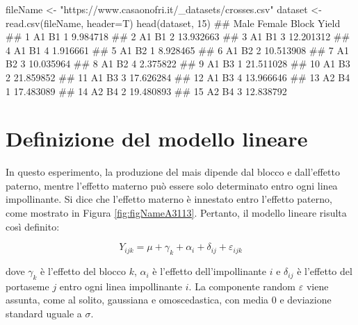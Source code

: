 \documentclass[a4paper,12pt,oneside]{book}
\newenvironment{Shaded}{\begin{snugshade}}{\end{snugshade}}
\newcommand{\DecValTok}[1]{#1}
\newcommand{\StringTok}[1]{#1}
\newcommand{\DocumentationTok}[1]{#1}
\newcommand{\OtherTok}[1]{#1}
\newcommand{\FunctionTok}[1]{#1}
\newcommand{\AttributeTok}[1]{#1}
\newcommand{\NormalTok}[1]{#1}
\begin{document}
\begin{Shaded}
\begin{Highlighting}[]
\NormalTok{fileName }\OtherTok{\textless{}{-}} \StringTok{"https://www.casaonofri.it/\_datasets/crosses.csv"}
\NormalTok{dataset }\OtherTok{\textless{}{-}} \FunctionTok{read.csv}\NormalTok{(fileName, }\AttributeTok{header=}\NormalTok{T)}
\FunctionTok{head}\NormalTok{(dataset, }\DecValTok{15}\NormalTok{)}
\DocumentationTok{\#\#    Male Female Block     Yield}
\DocumentationTok{\#\# 1    A1     B1     1  9.984718}
\DocumentationTok{\#\# 2    A1     B1     2 13.932663}
\DocumentationTok{\#\# 3    A1     B1     3 12.201312}
\DocumentationTok{\#\# 4    A1     B1     4  1.916661}
\DocumentationTok{\#\# 5    A1     B2     1  8.928465}
\DocumentationTok{\#\# 6    A1     B2     2 10.513908}
\DocumentationTok{\#\# 7    A1     B2     3 10.035964}
\DocumentationTok{\#\# 8    A1     B2     4  2.375822}
\DocumentationTok{\#\# 9    A1     B3     1 21.511028}
\DocumentationTok{\#\# 10   A1     B3     2 21.859852}
\DocumentationTok{\#\# 11   A1     B3     3 17.626284}
\DocumentationTok{\#\# 12   A1     B3     4 13.966646}
\DocumentationTok{\#\# 13   A2     B4     1 17.483089}
\DocumentationTok{\#\# 14   A2     B4     2 19.480893}
\DocumentationTok{\#\# 15   A2     B4     3 12.838792}
\end{Highlighting}
\end{Shaded}

\hypertarget{definizione-del-modello-lineare-2}{%
\section{Definizione del modello lineare}\label{definizione-del-modello-lineare-2}}

In questo esperimento, la produzione del mais dipende dal blocco e dall'effetto paterno, mentre l'effetto materno può essere solo determinato entro ogni linea impollinante. Si dice che l'effetto materno è innestato entro l'effetto paterno, come mostrato in Figura \ref{fig:figNameA3113}. Pertanto, il modello lineare risulta così definito:

\[Y_{ijk} = \mu + \gamma_k + \alpha_i + \delta_{ij} + \varepsilon_{ijk}\]

dove \(\gamma_k\) è l'effetto del blocco \(k\), \(\alpha_i\) è l'effetto dell'impollinante \(i\) e \(\delta_{ij}\) è l'effetto del portaseme \(j\) entro ogni linea impollinante \(i\). La componente random \(\varepsilon\) viene assunta, come al solito, gaussiana e omoscedastica, con media 0 e deviazione standard uguale a \(\sigma\).
\end{document}
